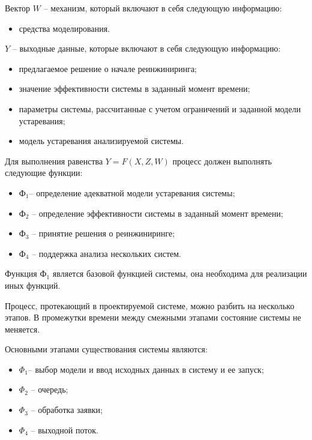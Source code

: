 Вектор $W$ – механизм, который включают в себя следующую информацию:

\begin{itemize}
    \item средства моделирования.
\end{itemize}

$Y$ – выходные данные, которые включают в себя следующую информацию:
\begin{itemize}
    \item предлагаемое решение о начале реинжиниринга;
    \item значение эффективности системы в заданный момент времени;
    \item параметры системы, рассчитанные с учетом ограничений и заданной модели устаревания;
    \item модель устаревания анализируемой системы.
\end{itemize}
	
Для выполнения равенства $Y=F(X,Z,W)$  процесс должен выполнять следующие функции:
\begin{itemize}
    \item $Ф_1$– определение адекватной модели устаревания системы;
    \item $Ф_2$ – определение эффективности системы в заданный момент времени;
    \item $Ф_3$ – принятие решения о реинжиниринге;
    \item $Ф_4$ – поддержка анализа нескольких систем.
\end{itemize}

Функция $Ф_1$ является базовой функцией системы, она необходима для реализации иных функций.

Процесс, протекающий в проектируемой системе, можно разбить на несколько этапов. В промежутки времени между смежными этапами состояние системы не меняется. 

Основными этапами существования системы являются:
\begin{itemize}
    \item $\Phi_1$– выбор модели и ввод исходных данных в систему и ее запуск; 
    \item $\Phi_2$ – очередь;
    \item $\Phi_3$ – обработка заявки;
    \item $\Phi_4$ – выходной поток.
\end{itemize}
	 
